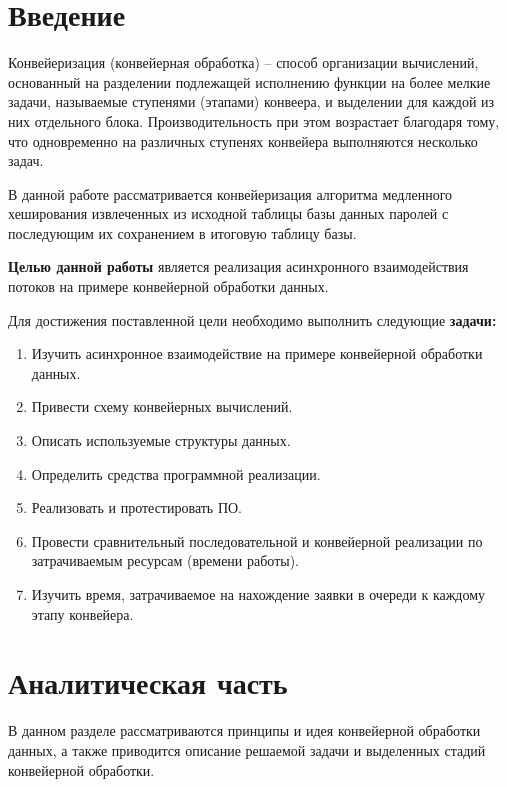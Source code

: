 \documentclass[a4paper,oneside,14pt]{extreport}
\begin{document}

\newpage
\tableofcontents
{}

\newpage

\chapter*{Введение}
Конвейеризация (конвейерная обработка) -- способ организации вычислений, основанный на разделении подлежащей исполнению функции на более мелкие задачи, называемые ступенями (этапами) конвеера, и выделении для каждой из них отдельного блока. Производительность при этом возрастает благодаря тому, что одновременно на различных ступенях конвейера выполняются несколько задач.

В данной работе рассматривается конвейеризация алгоритма медленного хеширования извлеченных из исходной таблицы базы данных паролей с последующим их сохранением в итоговую таблицу базы.

\textbf{Целью данной работы} является реализация асинхронного взаимодействия потоков на примере конвейерной обработки данных.

Для достижения поставленной цели необходимо выполнить следующие \textbf{задачи:}
\begin{enumerate}
	\item Изучить асинхронное взаимодействие на примере конвейерной обработки данных.
	\item Привести схему конвейерных вычислений.
	\item Описать используемые структуры данных.
	\item Определить средства программной реализации.
	\item Реализовать и протестировать ПО.
	\item Провести сравнительный последовательной и конвейерной реализации по затрачиваемым ресурсам (времени работы).
	\item Изучить время, затрачиваемое на нахождение заявки в очереди к каждому этапу конвейера.
\end{enumerate}
\newpage

\chapter{Аналитическая часть}	
В данном разделе рассматриваются принципы и идея конвейерной обработки данных, а также приводится описание решаемой задачи и выделенных стадий конвейерной обработки.
	
\end{document}
